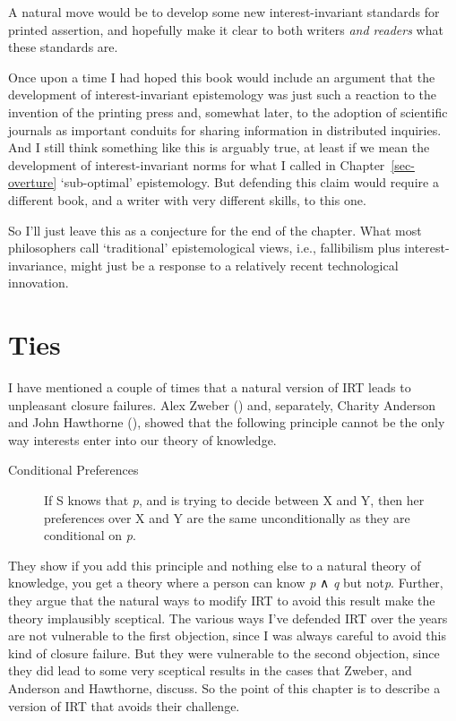 \documentclass[
  12pt,
  letterpaper,
]{scrbook}
\begin{document}
A natural move would be to develop some new interest-invariant standards
for printed assertion, and hopefully make it clear to both writers
\emph{and readers} what these standards are.

Once upon a time I had hoped this book would include an argument that
the development of interest-invariant epistemology was just such a
reaction to the invention of the printing press and, somewhat later, to
the adoption of scientific journals as important conduits for sharing
information in distributed inquiries. And I still think something like
this is arguably true, at least if we mean the development of
interest-invariant norms for what I called in Chapter~\ref{sec-overture}
`sub-optimal' epistemology. But defending this claim would require a
different book, and a writer with very different skills, to this one.

So I'll just leave this as a conjecture for the end of the chapter. What
most philosophers call `traditional' epistemological views, i.e.,
fallibilism plus interest-invariance, might just be a response to a
relatively recent technological innovation.


\chapter{Ties}\label{sec-ties}

I have mentioned a couple of times that a natural version of IRT leads
to unpleasant closure failures. Alex Zweber
() and, separately, Charity Anderson and
John Hawthorne (), showed
that the following principle cannot be the only way interests enter into
our theory of knowledge.

\begin{description}
\item[Conditional Preferences]
If S knows that \emph{p}, and is trying to decide between X and Y, then
her preferences over X and Y are the same unconditionally as they are
conditional on \emph{p}.
\end{description}

They show if you add this principle and nothing else to a natural theory
of knowledge, you get a theory where a person can know \emph{p} ∧
\emph{q} but not\emph{p}. Further, they argue that the natural ways to
modify IRT to avoid this result make the theory implausibly sceptical.
The various ways I've defended IRT over the years are not vulnerable to
the first objection, since I was always careful to avoid this kind of
closure failure. But they were vulnerable to the second objection, since
they did lead to some very sceptical results in the cases that Zweber,
and Anderson and Hawthorne, discuss. So the point of this chapter is to
describe a version of IRT that avoids their challenge.
\end{document}
